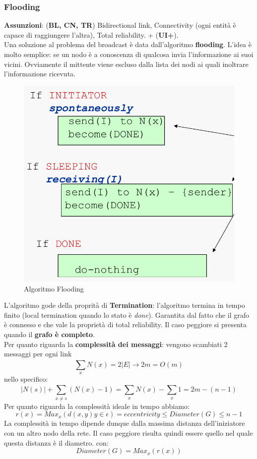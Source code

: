 \documentclass[12pt]{article}
\begin{document}
		\subsubsection{Flooding}
			\textbf{Assunzioni}: (\textbf{{BL, CN, TR}}) Bidirectional link, Connectivity (ogni entità è capace di raggiungere l'altra), Total reliability. + (\textbf{UI+}).\\
			Una soluzione al problema del broadcast è data dall'algoritmo \textbf{flooding}. L'idea è molto semplice: se un nodo è a conoscenza di qualcosa invia l'informazione ai suoi vicini. Ovviamente il mittente viene escluso dalla lista dei nodi ai quali inoltrare l'informazione ricevuta.
			\begin{figure}[h!]
				\centering
				\includegraphics[scale=0.4]{img/flood.png}
				\caption{Algoritmo Flooding}
			\end{figure}
		L'algoritmo gode della proprità di \textbf{Termination}: l'algoritmo termina in tempo finito (local termination quando lo stato è \textit{done}). Garantita dal fatto che il grafo è connesso e che vale la proprietà di total reliability. Il caso peggiore si presenta quando il \textbf{grafo è completo}.\\
		Per quanto riguarda la \textbf{complessità dei messaggi}: vengono scambiati 2 messaggi per ogni link $$\sum_{x}^{}N(x)=2|E| \rightarrow 2m = O(m) $$ nello specifico:
		$$|N(s)|+\sum_{x\neq s}^{}(N(x)-1)=\sum_{x}^{}N(x)-\sum_{x}^{}1 = 2m-(n-1)$$
		Per quanto riguarda la complessità ideale in tempo abbiamo:
		$$r(x)=Max_x(d(x,y) y \in \epsilon)=eccentricity \leq Diameter(G) \leq n-1$$
		La complessità in tempo dipende dunque dalla massima distanza dell'iniziatore con un altro nodo della rete. Il caso peggiore risulta quindi essere quello nel quale questa distanza è il diametro.
		con:
		$$Diameter(G)=Max_x(r(x))  $$
		
\end{document}
